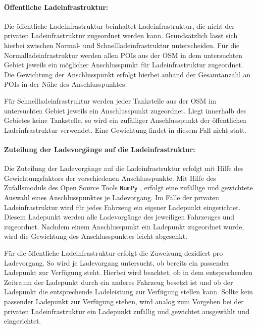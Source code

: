 \paragraph{Öffentliche Ladeinfrastruktur:}

Die öffentliche Ladeinfrastruktur beinhaltet Ladeinfrastruktur, die nicht der privaten Ladeinfrastruktur zugeordnet werden kann.
Grundsätzlich lässt sich hierbei zwischen Normal- und Schnellladeinfrastruktur unterscheiden.
Für die Normalladeinfrastruktur werden allen \glspl{POI} aus der \gls{OSM} \cite{OpenStreetMapFoundation} in dem untersuchten Gebiet jeweils ein möglicher Anschlusspunkt für Ladeinfrastruktur zugeordnet.
Die Gewichtung der Anschlusspunkt erfolgt hierbei anhand der Gesamtanzahl an \glspl{POI} in der Nähe des Anschlusspunktes.\medskip

Für Schnellladeinfrastruktur werden jeder Tankstelle aus der \gls{OSM} \cite{OpenStreetMapFoundation} im untersuchten Gebiet jeweils ein Anschlusspunkt zugeordnet.
Liegt innerhalb des Gebietes keine Tankstelle, so wird ein zufälliger Anschlusspunkt der öffentlichen Ladeinfrastruktur verwendet.
Eine Gewichtung findet in diesem Fall nicht statt.


\paragraph{Zuteilung der Ladevorgänge auf die Ladeinfrastruktur:}

Die Zuteilung der Ladevorgänge auf die Ladeinfrastruktur erfolgt mit Hilfe des Gewichtungsfaktors der verschiedenen Anschlusspunkte.
Mit Hilfe des Zufallsmoduls des Open Source Tools \texttt{NumPy} \cite{harris2020array}, erfolgt eine zufällige und gewichtete Auswahl eines Anschlusspunktes je Ladevorgang.
Im Falle der privaten Ladeinfrastruktur wird für jedes Fahrzeug ein eigener Ladepunkt eingerichtet.
Diesem Ladepunkt werden alle Ladevorgänge des jeweiligen Fahrzeuges und \UCs zugeordnet.
Nachdem einem Anschlusspunkt ein Ladepunkt zugeordnet wurde, wird die Gewichtung des Anschlusspunktes leicht abgesenkt.\medskip

Für die öffentliche Ladeinfrastruktur erfolgt die Zuweisung dezidiert pro Ladevorgang.
So wird je Ladevorgang untersucht, ob bereits ein passender Ladepunkt zur Verfügung steht.
Hierbei wird beachtet, ob in dem entsprechenden Zeitraum der Ladepunkt durch ein anderes Fahrzeug besetzt ist und ob der Ladepunkt die entsprechende Ladeleistung zur Verfügung stellen kann.
Sollte kein passender Ladepunkt zur Verfügung stehen, wird analog zum Vorgehen bei der privaten Ladeinfrastruktur ein Ladepunkt zufällig und gewichtet ausgewählt und eingerichtet.


